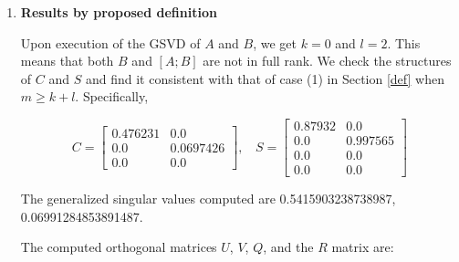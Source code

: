     \begin{enumerate}[(1).]
        \item \textbf{Results by proposed definition}
            
            Upon execution of the GSVD of $A$ and $B$, we get $k = 0$ and $l = 2$. This means that both $B$ and $[A; B]$ are not in full rank. We check the structures of $C$ and $S$ and find it consistent with that of case (1) in Section \ref{def} when $m \geq k+l$. Specifically, 
            
            \begin{equation*}
                C = \begin{bmatrix}
                     0.476231 & 0.0  \\     
                     0.0      & 0.0697426 \\
                     0.0      & 0.0      
                \end{bmatrix}, \ \ \ \
                S = \begin{bmatrix}
                     0.87932 & 0.0    \\  
                     0.0     & 0.997565 \\
                     0.0     & 0.0  \\   
                     0.0     & 0.0   
                \end{bmatrix}
            \end{equation*}
   
            The generalized singular values computed are 0.5415903238738987, 0.06991284853891487.

            The computed orthogonal matrices $U$, $V$, $Q$, and the $R$ matrix are: 
    

\end{enumerate}
